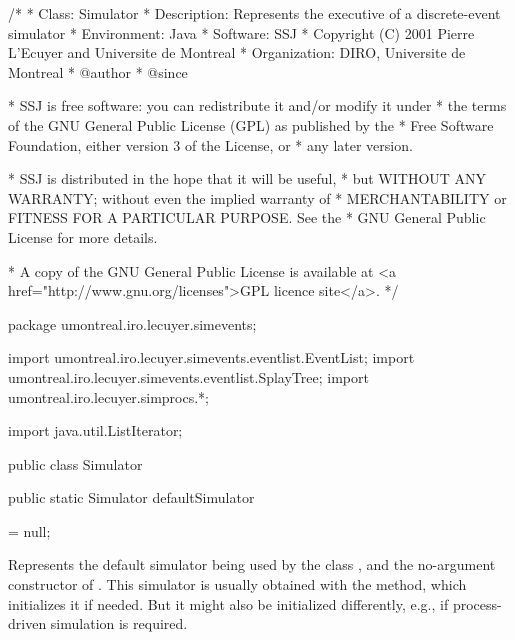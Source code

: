 \begin{code}
\begin{hide}
/*
 * Class:        Simulator
 * Description:  Represents the executive of a discrete-event simulator
 * Environment:  Java
 * Software:     SSJ
 * Copyright (C) 2001  Pierre L'Ecuyer and Universite de Montreal
 * Organization: DIRO, Universite de Montreal
 * @author
 * @since

 * SSJ is free software: you can redistribute it and/or modify it under
 * the terms of the GNU General Public License (GPL) as published by the
 * Free Software Foundation, either version 3 of the License, or
 * any later version.

 * SSJ is distributed in the hope that it will be useful,
 * but WITHOUT ANY WARRANTY; without even the implied warranty of
 * MERCHANTABILITY or FITNESS FOR A PARTICULAR PURPOSE.  See the
 * GNU General Public License for more details.

 * A copy of the GNU General Public License is available at
   <a href="http://www.gnu.org/licenses">GPL licence site</a>.
 */
\end{hide}
package umontreal.iro.lecuyer.simevents;\begin{hide}

import umontreal.iro.lecuyer.simevents.eventlist.EventList;
import umontreal.iro.lecuyer.simevents.eventlist.SplayTree;
import umontreal.iro.lecuyer.simprocs.*;\end{hide}
   import java.util.ListIterator;

public class Simulator \begin{hide} {

   protected double currentTime = 0.0;
      // The current simulation time (clock).

   protected EventList eventList;
      // The list of future events.
      // Can be changed by the method \texttt{init}.

   protected boolean stopped = true;
      // Becomes true when the simulation has ended
      // (stopped has been called or the event list is empty).

   protected boolean simulating = false;

   protected ContinuousState continuousState = null; \end{hide}

   public static Simulator defaultSimulator\begin{hide} = null;\end{hide}
\end{code}
   \begin{tabb} Represents the default simulator being used by the
     class , and the no-argument constructor of .
     This simulator is usually obtained with the
      method, which initializes it if needed.
     But it might also be initialized
     differently, e.g., if process-driven simulation is required.
   \end{tabb}
